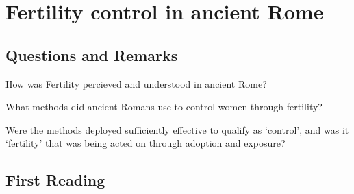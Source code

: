 %
%
%
\chapter{Fertility control in ancient Rome}
\label{FertContInRome} %








\abstract{}

\section{Questions and Remarks}
\label{sec:QR6}


\begin{qst}
    How was Fertility percieved and understood in ancient Rome?
\end{qst}


\begin{qst}
    What methods did ancient Romans use to control women through fertility?
\end{qst}


\begin{qst}
    Were the methods deployed sufficiently effective to qualify as `control', and was it `fertility' that was being acted on through adoption and exposure?
\end{qst}




\section{First Reading}
\label{sec:FirRead6}


